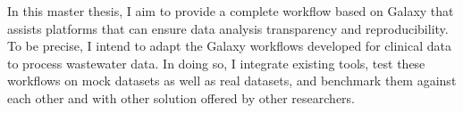     In this master thesis, I aim to provide a complete workflow based on Galaxy that assists platforms that can ensure data analysis transparency and reproducibility. To be precise, I intend to adapt the Galaxy workflows developed for clinical data to process wastewater data. In doing so, I integrate existing tools, test these workflows on mock datasets as well as real datasets, and benchmark them against each other and with other solution offered by other researchers.
    
     






